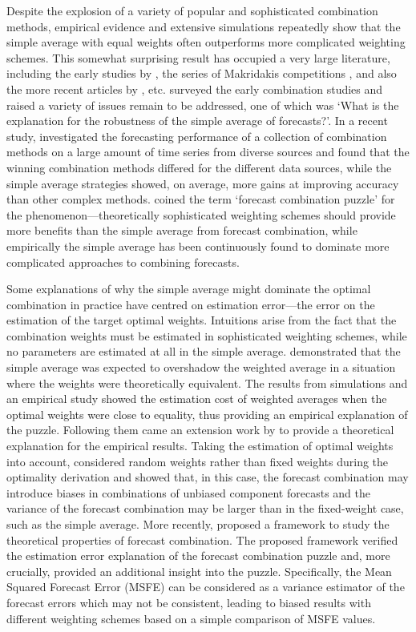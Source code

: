 \documentclass[11pt]{article}
\begin{document}
Despite the explosion of a variety of popular and sophisticated combination methods, empirical evidence and extensive simulations repeatedly show that the simple average with equal weights often outperforms more complicated weighting schemes. This somewhat surprising result has occupied a very large literature, including the early studies by \cite{Stock1998-np,Stock2003-sp,Stock2004-rq}, the series of Makridakis competitions \citep{Makridakis1982-hb,Makridakis2000-he,Makridakis2020-hu}, and also the more recent articles by \cite{Blanc2016-sn}, etc. \cite{Clemen1989-fb} surveyed the early combination studies and raised a variety of issues remain to be addressed, one of which was `What is the explanation for the robustness of the simple average of forecasts?'. In a recent study, \cite{Gastinger2021-ey} investigated the forecasting performance of a collection of combination methods on a large amount of time series from diverse sources and found that the winning combination methods differed for the different data sources, while the simple average strategies showed, on average, more gains at improving accuracy than other complex methods. \cite{Stock2004-rq} coined the term `forecast combination puzzle' for the phenomenon---theoretically sophisticated weighting schemes should provide more benefits than the simple average from forecast combination, while empirically the simple average has been continuously found to dominate more complicated approaches to combining forecasts.

Some explanations of why the simple average might dominate the optimal combination in practice have centred on estimation error---the error on the estimation of the target optimal weights. Intuitions arise from the fact that the combination weights must be estimated in sophisticated weighting schemes, while no parameters are estimated at all in the simple average. \cite{Smith2009-wd} demonstrated that the simple average was expected to overshadow the weighted average in a situation where the weights were theoretically equivalent. The results from simulations and an empirical study showed the estimation cost of weighted averages when the optimal weights were close to equality, thus providing an empirical explanation of the puzzle. Following them came an extension work by \cite{Claeskens2016-pv} to provide a theoretical explanation for the empirical results. Taking the estimation of optimal weights into account, \cite{Claeskens2016-pv} considered random weights rather than fixed weights during the optimality derivation and showed that, in this case, the forecast combination may introduce biases in combinations of unbiased component forecasts and the variance of the forecast combination may be larger than in the fixed-weight case, such as the simple average. More recently, \cite{Chan2018-jl} proposed a framework to study the theoretical properties of forecast combination. The proposed framework verified the estimation error explanation of the forecast combination puzzle and, more crucially, provided an additional insight into the puzzle. Specifically, the Mean Squared Forecast Error (MSFE) can be considered as a variance estimator of the forecast errors which may not be consistent, leading to biased results with different weighting schemes based on a simple comparison of MSFE values.
\end{document}
